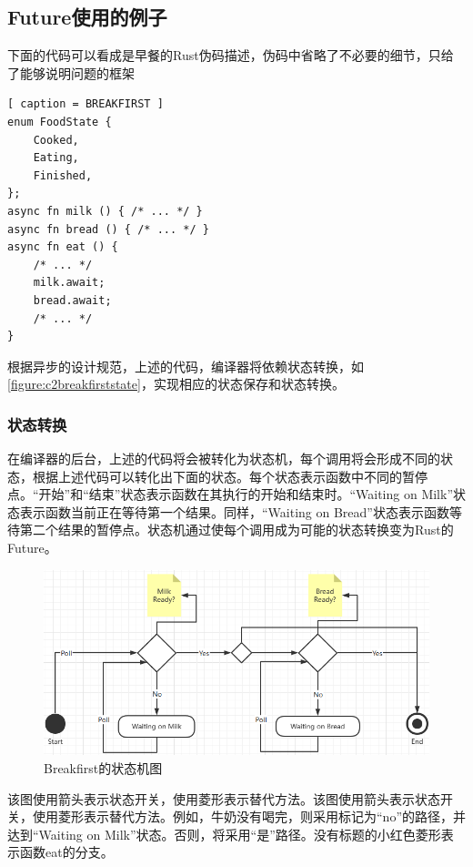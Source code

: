 \subsection{Future使用的例子}

下面的代码可以看成是早餐的Rust伪码描述，伪码中省略了不必要的细节，只给了能够说明问题的框架

\begin{lstlisting}[ caption = BREAKFIRST ]
enum FoodState {
    Cooked,
    Eating,
    Finished,
};
async fn milk () { /* ... */ }
async fn bread () { /* ... */ }
async fn eat () {
    /* ... */
    milk.await;
    bread.await;
    /* ... */
}

\end{lstlisting}

根据异步的设计规范，上述的代码，编译器将依赖状态转换，如\autoref{figure:c2breakfirststate}，实现相应的状态保存和状态转换。

\subsubsection{状态转换}

在编译器的后台，上述的代码将会被转化为状态机，每个调用将会形成不同的状态，根据上述代码可以转化出下面的状态。每个状态表示函数中不同的暂停点。“开始”和“结束”状态表示函数在其执行的开始和结束时。“Waiting on Milk”状态表示函数当前正在等待第一个结果。同样，“Waiting on Bread”状态表示函数等待第二个结果的暂停点。状态机通过使每个调用成为可能的状态转换变为Rust的Future。

\begin{figure}[htb]
    \figureCapSet
    \centering
    \includegraphics[width=.8\linewidth]{figure/c2/breakfirststate.png}
    \caption{Breakfirst的状态机图}
    \label{figure:c2breakfirststate}
\end{figure}

该图使用箭头表示状态开关，使用菱形表示替代方法。该图使用箭头表示状态开关，使用菱形表示替代方法。例如，牛奶没有喝完，则采用标记为“no”的路径，并达到“Waiting on Milk”状态。否则，将采用“是”路径。没有标题的小红色菱形表示函数eat的分支。

